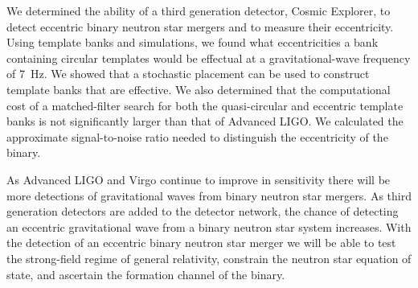 We determined the ability of a third generation detector, Cosmic Explorer, to detect eccentric binary neutron star mergers and to measure their eccentricity. Using template banks and simulations, we found what eccentricities a bank containing circular templates would be effectual at a gravitational-wave frequency of 7~Hz. We showed that a stochastic placement can be used to construct template banks that are effective. We also determined that the computational cost of a matched-filter search for both the quasi-circular and eccentric template banks is not significantly larger than that of Advanced LIGO. We calculated the approximate signal-to-noise ratio needed to distinguish the eccentricity of the binary. 

As Advanced LIGO and Virgo continue to improve in sensitivity there will be more detections of gravitational waves from binary neutron star mergers. As third generation detectors are added to the detector network, the chance of detecting an eccentric gravitational wave from a binary neutron star system increases. With the detection of an eccentric binary neutron star merger we will be able to test the strong-field regime of general relativity, constrain the neutron star equation of state, and ascertain the formation channel of the binary.